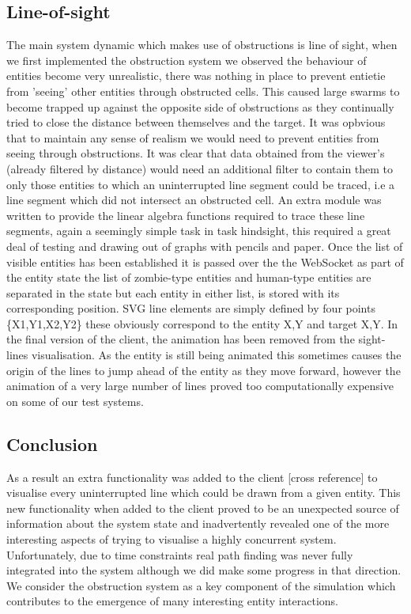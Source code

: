 \subsection{Line-of-sight}
\label{line_of_sight}
The main system dynamic which makes use of obstructions is line of sight, when we first implemented the obstruction system we observed the behaviour of entities become very unrealistic, there was nothing in place to prevent entietie from 'seeing' other entities through obstructed cells. This caused large swarms to become trapped up against the opposite side of obstructions as they continually tried to close the distance between themselves and the target. It was opbvious that to maintain any sense of realism we would need to prevent entities from seeing through obstructions.
It was clear that data obtained from the viewer's (already filtered by distance) would need an additional filter to contain them to only those entities to which an uninterrupted line segment could be traced, i.e a line segment which did not intersect an obstructed cell. An extra module was written to provide the linear algebra functions required to trace these line segments, again a seemingly simple task in task hindsight, this required a great deal of testing and drawing out of graphs with pencils and paper.
Once the list of visible entities has been established it is passed over the the WebSocket as part of the entity state the list of zombie-type entities and human-type entities are separated in the state but each entity in either list, is stored with its corresponding position. SVG line elements are simply defined by four points \{X1,Y1,X2,Y2\} these obviously correspond to the entity X,Y and target X,Y. In the final version of the client, the animation has been removed from the sight-lines visualisation. As the entity is still being animated this sometimes causes the origin of the lines to jump ahead of the entity as they move forward, however the animation of a very large number of lines proved too computationally expensive on some of our test systems.
\subsection{Conclusion}
As a result an extra functionality was added to the client [cross reference] to visualise every uninterrupted line which could be drawn from a given entity. This new functionality when added to the client proved to be an unexpected source of information about the system state and inadvertently revealed one of the more interesting aspects of trying to visualise a highly concurrent system.
Unfortunately, due to time constraints real path finding was never fully integrated into the system although we did make some progress in that direction. We consider the obstruction system as a key component of the simulation which contributes to the emergence of many interesting entity interactions.

\clearpage
\endinput
